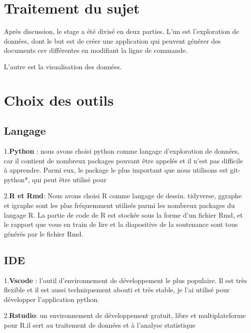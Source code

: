 \documentclass[
  oneside]{book}
\begin{document}
\hypertarget{traitement-du-sujet}{%
\section{Traitement du sujet}\label{traitement-du-sujet}}

Après discussion, le stage a été divisé en deux parties.
L'un est l'exploration de données, dont le but est de créer une application qui peuvent générer des documents csv différentes en modifiant la ligne de commande.

L'autre est la visualisation des données.

\hypertarget{choix-des-outils}{%
\section{Choix des outils}\label{choix-des-outils}}

\hypertarget{langage}{%
\subsection{Langage}\label{langage}}

1.\textbf{Python} : nous avons choisi python comme langage d'exploration de données, car il contient de nombreux packages pouvant être appelés et il n'est pas difficile à apprendre.
Parmi eux, le package le plus important que nous utilisons est git-python*, qui peut être utilisé pour

2.\textbf{R et Rmd}: Nous avons choisi R comme langage de dessin. tidyverse, ggraphe et igraphe sont les plus fréquemment utilisés parmi les nombreux packages du langage R. La partie de code de R est stockée sous la forme d'un fichier Rmd, et le rapport que vous en train de lire et la diapositive de la soutenance sont tous générés par le fichier Rmd.

\hypertarget{ide}{%
\subsection{IDE}\label{ide}}

1.\textbf{Vscode} : l'outil d'environnement de développement le plus populaire. Il est très flexible et il est aussi techniquement abouti et très stable, je l'ai utilisé pour développer l'application python.

2.\textbf{Rstudio}: un environnement de développement gratuit, libre et multiplateforme pour R.il sert au traitement de données et à l'analyse statistique
\end{document}
